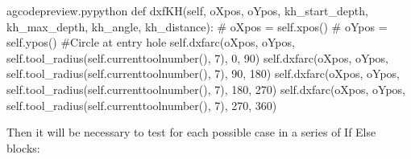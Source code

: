 \documentclass{ltxdoc}
\begin{document}
\lstset{firstnumber=\thegcpy}
\begin{writecode}{a}{gcodepreview.py}{python}
    def dxfKH(self, oXpos, oYpos, kh_start_depth, kh_max_depth, kh_angle, kh_distance):
#        oXpos = self.xpos()
#        oYpos = self.ypos()
#Circle at entry hole
        self.dxfarc(oXpos, oYpos, self.tool_radius(self.currenttoolnumber(), 7), 0, 90)
        self.dxfarc(oXpos, oYpos, self.tool_radius(self.currenttoolnumber(), 7), 90, 180)
        self.dxfarc(oXpos, oYpos, self.tool_radius(self.currenttoolnumber(), 7), 180, 270)
        self.dxfarc(oXpos, oYpos, self.tool_radius(self.currenttoolnumber(), 7), 270, 360)
\end{writecode}
\addtocounter{gcpy}{8}

Then it will be necessary to test for each possible case in a series of If Else blocks:
 
\end{document}
